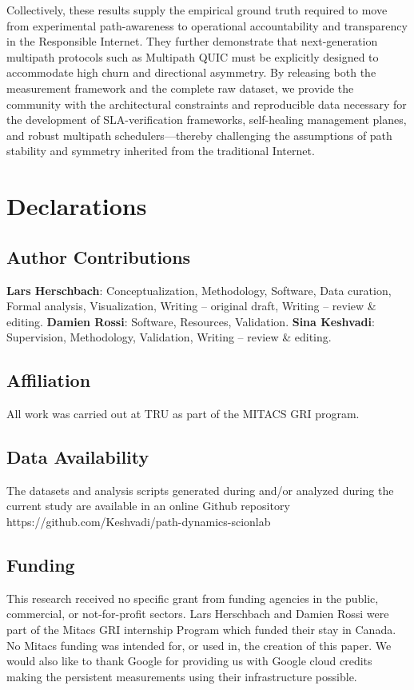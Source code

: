 \documentclass[pdflatex,sn-vancouver-num]{sn-jnl}%
\theoremstyle{thmstyleone}%
\theoremstyle{thmstyletwo}%
\theoremstyle{thmstylethree}%
\begin{document}
Collectively, these results supply the empirical ground truth required to move from experimental path-awareness to operational accountability and transparency in the Responsible Internet. They further demonstrate that next-generation multipath protocols such as Multipath QUIC must be explicitly designed to accommodate high churn and directional asymmetry. By releasing both the measurement framework and the complete raw dataset, we provide the community with the architectural constraints and reproducible data necessary for the development of SLA-verification frameworks, self-healing management planes, and robust multipath schedulers—thereby challenging the assumptions of path stability and symmetry inherited from the traditional Internet.

\backmatter


\section*{Declarations}

\subsection{Author Contributions}
\textbf{Lars Herschbach}: Conceptualization, Methodology, Software, Data curation, Formal analysis, Visualization, Writing -- original draft, Writing -- review \& editing.\newline
\textbf{Damien Rossi}: Software, Resources, Validation. \newline
\textbf{Sina Keshvadi}: Supervision, Methodology, Validation, Writing -- review \& editing. \newline

\subsection{Affiliation}
All work was carried out at TRU as part of the MITACS GRI program.

\subsection{Data Availability}
The datasets and analysis scripts generated during and/or analyzed during the current study are available in an online Github repository https://github.com/Keshvadi/path-dynamics-scionlab


\subsection{Funding}
This research received no specific grant from funding agencies in the public, commercial, or not-for-profit sectors. Lars Herschbach and Damien Rossi were part of the Mitacs GRI internship Program which funded their stay in Canada. No Mitacs funding was intended for, or used in, the creation of this paper.
We would also like to thank Google for providing us with Google cloud credits making the persistent measurements using their infrastructure possible. 
\end{document}
